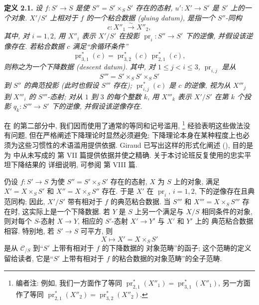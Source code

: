 \medskip
\noindent{}\textbf{定义 2.1.}
\textit{设 \(f:S'\to S\) 是使 \(S''=S'\times_SS'\) 存在的态射,
\(u':X'\to S'\) 是 \(S'\) 上的一个对象.
\(X'/S'\) 上相对于 \(f\) 的一个\emph{粘合数据 (gluing datum)},
是指一个 \(S''\)-同构}
\[
  c:X''_1\xrightarrow{\sim}X''_2,
\]
\textit{其中, 对 \(i=1,2\), 用 \(X''_i\) 表示 \(X'/S'\)
在投影 \(\operatorname{pr}_i:S''\to S'\) 下的逆像, 并假设该逆像存在.
若粘合数据 \(c\) 满足``余循环条件''}
\[
  \operatorname{pr}_{3,1}^{*}(c)
  =\operatorname{pr}_{3,2}^{*}(c)\,
   \operatorname{pr}_{2,1}^{*}(c),
\]
\textit{则称之为一个\emph{下降数据 (descent datum)}.
其中, 对 \(1\leq j<i\leq3\), \(\operatorname{pr}_{i,j}\)
是从}
\[
  S'''=S'\times_SS'\times_SS'
\]
\textit{到 \(S''\) 的典范投影 (此时也假设 \(S'''\) 存在);
\(\operatorname{pr}_{i,j}^{*}(c)\) 是 \(c\) 的逆像,
视为从 \(X'''_j\) 到 \(X'''_i\) 的 \(S'''\)-态射;
对从 \(1\) 到 \(3\) 的每个整数 \(k\), 用 \(X'''_k\) 表示
\(X'/S'\) 在第 \(k\) 个投影 \(q_k:S'''\to S'\) 下的逆像,
并假设该逆像存在.}

在  的第二部分中,
我们因而使用了通常的等同和记号滥用,
\footnote{编者注: 例如, 我们一方面作了等同
\(\operatorname{pr}_{2,1}^{*}(X''_1)
 =\operatorname{pr}_{3,1}^{*}(X''_1)\), 另一方面作了等同
\(\operatorname{pr}_{2,1}^{*}(X''_2)
 =\operatorname{pr}_{3,2}^{*}(X''_2)\).}
经验表明这些做法没有问题, 但在严格阐述下降理论时显然必须避免;
下降理论本身在某种程度上也必须为这些习惯性的术语滥用提供依据.
Giraud 已写出这样的形式化阐述 (),
目的是为  中从未写成的
第 VII 篇提供依据并使之精确. 关于本讨论班反复使用的忠实平坦下降结果的
详细说明, 可参阅  第 VIII 篇.

仍设 \(f:S'\to S\) 为使 \(S''=S'\times_SS'\) 存在的态射,
\(X\) 为 \(S\) 上的对象, 满足 \(X'=X\times_SS'\) 和
\(X''=X\times_SS''\) 存在. 于是 \(X'\) 在
\(\operatorname{pr}_i\), \(i=1,2\), 下的逆像存在且典范同构;
因此, \(X'/S'\) 带有相对于 \(f\) 的典范粘合数据.
当 \(S'''\) 和 \(X'''=X\times_SS'''\) 存在时,
这实际上是一个下降数据. 若 \(Y\) 是 \(S\) 上另一个满足与
\(X/S\) 相同条件的对象, 则对每个 \(S\)-态射 \(X\to Y\),
相应的 \(S'\)-态射 \(X'\to Y'\) 与 \(X'\) 和 \(Y'\) 上的
典范粘合数据相容. 特别地, 若 \(S'\to S\) 可平方, 则
\[
  X\longmapsto X'=X\times_SS'
\]
是从 \(\mathscr C_{/S}\) 到``\(S'\) 上带有相对于 \(f\) 的下降数据的
对象范畴''的函子; 这个范畴的定义留给读者,
它是``\(S'\) 上带有相对于 \(f\) 的粘合数据的对象范畴''的全子范畴.

